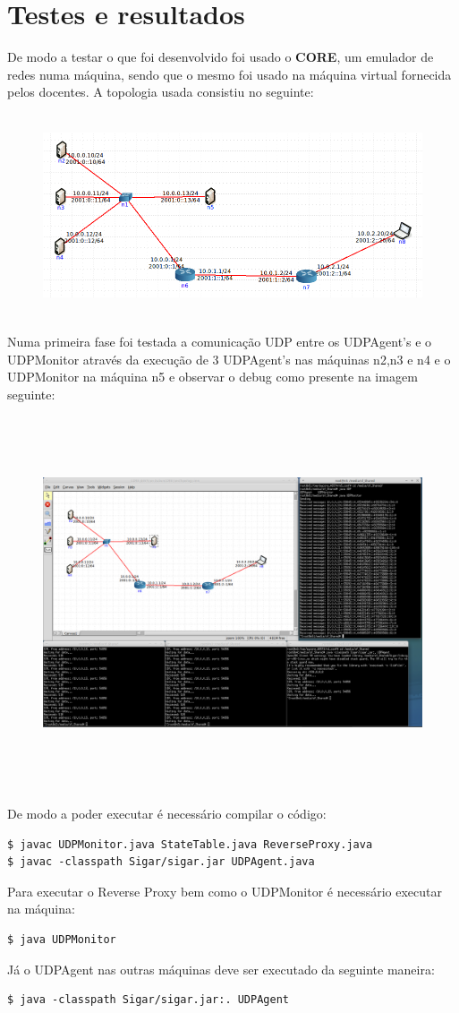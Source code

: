 \documentclass{article}
\begin{document}
\section{Testes e resultados}
De modo a testar o que foi desenvolvido foi usado o \textbf{CORE}, um emulador de redes numa máquina, sendo que o mesmo foi usado na máquina virtual fornecida pelos docentes. A topologia usada consistiu no seguinte:
\begin{figure}[H]
	\centering
	\includegraphics[height=6cm]{topologia.png}
\end{figure}
Numa primeira fase foi testada a comunicação UDP entre os UDPAgent's e o UDPMonitor através da execução de 3 UDPAgent's nas máquinas n2,n3 e n4 e o UDPMonitor na máquina n5 e observar o debug como presente na imagem seguinte:
\begin{figure}[H]
	\advance\leftskip-2cm
    \includegraphics[height=11cm]{teste1.png}
\end{figure}
De modo a poder executar é necessário compilar o código:
\begin{verbatim}
$ javac UDPMonitor.java StateTable.java ReverseProxy.java
$ javac -classpath Sigar/sigar.jar UDPAgent.java
\end{verbatim}
Para executar o Reverse Proxy bem como o UDPMonitor é necessário executar na máquina:
\begin{verbatim}
$ java UDPMonitor
\end{verbatim}
Já o UDPAgent nas outras máquinas deve ser executado da seguinte maneira:
\begin{verbatim}
$ java -classpath Sigar/sigar.jar:. UDPAgent
\end{verbatim}
\end{document}
